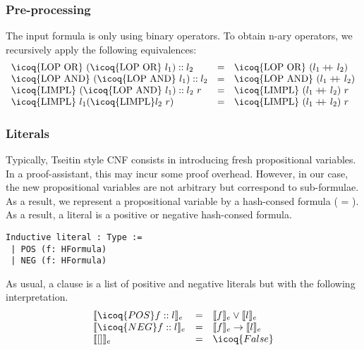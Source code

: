 \documentclass[a4paper,UKenglish,cleveref, autoref, thm-restate]{lipics-v2019}
\newcommand{\mcoq}[1]{\mbox{\icoq{#1}}}
\newcommand\doubleplus{+\kern-1.3ex+\kern0.8ex}
\begin{document}
\subsubsection{Pre-processing}
The input formula is only using binary operators.
To obtain n-ary operators, we recursively apply the following equivalences:
\[
  \begin{array}{lcl}
    \mcoq{LOP OR}\ (\mcoq{LOP OR}\ l_1):: l_2 &=& \mcoq{LOP OR}\ (l_1 \doubleplus l_2)\\
    \mcoq{LOP AND}\ (\mcoq{LOP AND}\ l_1):: l_2 &=& \mcoq{LOP AND}\ (l_1 \doubleplus l_2)\\
    \mcoq{LIMPL}\ (\mcoq{LOP AND}\ l_1):: l_2\  r  &=& \mcoq{LIMPL}\ (l_1 \doubleplus l_2)\ r\\
    \mcoq{LIMPL}\ l_1 (\mcoq{LIMPL} l_2\ r)  &=& \mcoq{LIMPL}\ (l_1 \doubleplus l_2)\ r\\
  \end{array}
\]

\subsubsection{Literals}
Typically, Tseitin style CNF consists in introducing fresh
propositional variables.  In a proof-assistant, this may incur some
proof overhead. However, in our case, the new propositional variables
are not arbitrary but correspond to sub-formulae. As a result, we
represent a propositional variable by a hash-consed formula ( = ). As a
result, a literal is a positive or negative hash-consed formula.
\begin{verbatim}
Inductive literal : Type :=
 | POS (f: HFormula)
 | NEG (f: HFormula)
\end{verbatim}
As usual, a clause is a list of positive and negative literals but with the following interpretation.
\[
  \begin{array}{lcl}
    \llbracket \icoq{POS} f :: l \rrbracket_e & = & \llbracket f \rrbracket_e \lor \llbracket l \rrbracket_e \\
    \llbracket \icoq{NEG} f :: l \rrbracket_e & = & \llbracket f \rrbracket_e \rightarrow \llbracket l \rrbracket_e \\
    \llbracket [] \rrbracket_e &= & \icoq{False} \\
  \end{array}
\]
\end{document}

